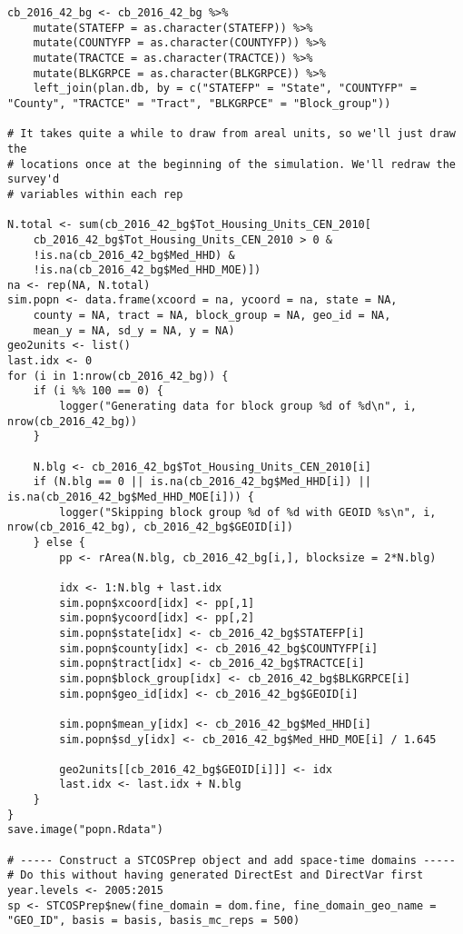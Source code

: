 \documentclass[12pt]{article}
\begin{document}
\begin{footnotesize}
\begin{verbatim}
cb_2016_42_bg <- cb_2016_42_bg %>%
    mutate(STATEFP = as.character(STATEFP)) %>%
    mutate(COUNTYFP = as.character(COUNTYFP)) %>%
    mutate(TRACTCE = as.character(TRACTCE)) %>%
    mutate(BLKGRPCE = as.character(BLKGRPCE)) %>%
    left_join(plan.db, by = c("STATEFP" = "State", "COUNTYFP" = "County", "TRACTCE" = "Tract", "BLKGRPCE" = "Block_group"))

# It takes quite a while to draw from areal units, so we'll just draw the
# locations once at the beginning of the simulation. We'll redraw the survey'd
# variables within each rep

N.total <- sum(cb_2016_42_bg$Tot_Housing_Units_CEN_2010[
    cb_2016_42_bg$Tot_Housing_Units_CEN_2010 > 0 &
    !is.na(cb_2016_42_bg$Med_HHD) &
    !is.na(cb_2016_42_bg$Med_HHD_MOE)])
na <- rep(NA, N.total)
sim.popn <- data.frame(xcoord = na, ycoord = na, state = NA,
    county = NA, tract = NA, block_group = NA, geo_id = NA,
    mean_y = NA, sd_y = NA, y = NA)
geo2units <- list()
last.idx <- 0
for (i in 1:nrow(cb_2016_42_bg)) {
    if (i %% 100 == 0) {
        logger("Generating data for block group %d of %d\n", i, nrow(cb_2016_42_bg))
    }

    N.blg <- cb_2016_42_bg$Tot_Housing_Units_CEN_2010[i]
    if (N.blg == 0 || is.na(cb_2016_42_bg$Med_HHD[i]) || is.na(cb_2016_42_bg$Med_HHD_MOE[i])) {
        logger("Skipping block group %d of %d with GEOID %s\n", i, nrow(cb_2016_42_bg), cb_2016_42_bg$GEOID[i])
    } else {
        pp <- rArea(N.blg, cb_2016_42_bg[i,], blocksize = 2*N.blg)

        idx <- 1:N.blg + last.idx
        sim.popn$xcoord[idx] <- pp[,1]
        sim.popn$ycoord[idx] <- pp[,2]
        sim.popn$state[idx] <- cb_2016_42_bg$STATEFP[i]
        sim.popn$county[idx] <- cb_2016_42_bg$COUNTYFP[i]
        sim.popn$tract[idx] <- cb_2016_42_bg$TRACTCE[i]
        sim.popn$block_group[idx] <- cb_2016_42_bg$BLKGRPCE[i]
        sim.popn$geo_id[idx] <- cb_2016_42_bg$GEOID[i]
        
        sim.popn$mean_y[idx] <- cb_2016_42_bg$Med_HHD[i]
        sim.popn$sd_y[idx] <- cb_2016_42_bg$Med_HHD_MOE[i] / 1.645

        geo2units[[cb_2016_42_bg$GEOID[i]]] <- idx
        last.idx <- last.idx + N.blg
    }
}
save.image("popn.Rdata")

# ----- Construct a STCOSPrep object and add space-time domains -----
# Do this without having generated DirectEst and DirectVar first
year.levels <- 2005:2015
sp <- STCOSPrep$new(fine_domain = dom.fine, fine_domain_geo_name = "GEO_ID", basis = basis, basis_mc_reps = 500)


\end{verbatim}
\end{footnotesize}
\end{document}
